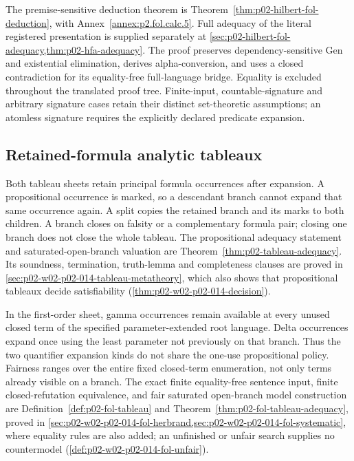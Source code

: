 
The premise-sensitive deduction theorem is
Theorem~\ref{thm:p02-hilbert-fol-deduction}, with
Annex~\ref{annex:p2.fol.calc.5}. Full adequacy of the literal registered
presentation is supplied separately at
\cref{sec:p02-hilbert-fol-adequacy,thm:p02-hfa-adequacy}.
The proof preserves dependency-sensitive Gen and existential elimination,
derives alpha-conversion, and uses a closed contradiction for its
equality-free full-language bridge. Equality is excluded throughout the
translated proof tree. Finite-input, countable-signature and arbitrary
signature cases retain their distinct set-theoretic assumptions; an
atomless signature requires the explicitly declared predicate expansion.

\subsection{Retained-formula analytic tableaux}

Both tableau sheets retain principal formula occurrences after expansion.
A propositional occurrence is marked, so a descendant branch cannot expand
that same occurrence again.  A split copies the retained branch and its
marks to both children.  A branch closes on falsity or a complementary
formula pair; closing one branch does not close the whole tableau.
The propositional adequacy statement and saturated-open-branch valuation
are Theorem~\ref{thm:p02-tableau-adequacy}.  Its soundness, termination,
truth-lemma and completeness clauses are proved in
\cref{sec:p02-w02-p02-014-tableau-metatheory}, which also shows that
propositional tableaux decide satisfiability
(\cref{thm:p02-w02-p02-014-decision}).


In the first-order sheet, gamma occurrences remain available at every
unused closed term of the specified parameter-extended root language.
Delta occurrences expand once using the least parameter not previously
on that branch.  Thus the two quantifier expansion kinds do not share
the one-use propositional policy.  Fairness ranges over the entire fixed
closed-term enumeration, not only terms already visible on a branch.
The exact finite equality-free sentence input, finite closed-refutation
equivalence, and fair saturated open-branch model construction are
Definition~\ref{def:p02-fol-tableau} and
Theorem~\ref{thm:p02-fol-tableau-adequacy}, proved in
\cref{sec:p02-w02-p02-014-fol-herbrand,sec:p02-w02-p02-014-fol-systematic},
where equality rules are also added; an unfinished or unfair search
supplies no countermodel (\cref{def:p02-w02-p02-014-fol-unfair}).

